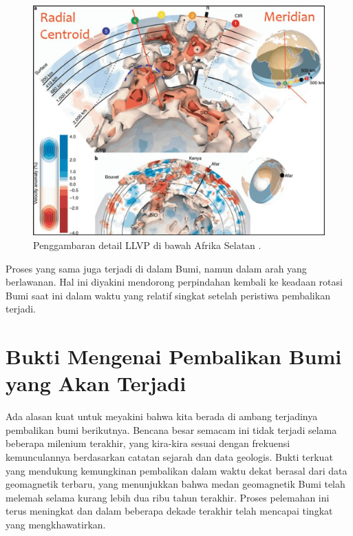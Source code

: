 \documentclass[10pt,twocolumn,letterpaper]{article}
\begin{document}
\begin{figure}[t]
\begin{center}
   \includegraphics[width=1\linewidth]{llvp.jpg}
\end{center}
   \caption{Penggambaran detail LLVP di bawah Afrika Selatan \cite{28}.}
\label{fig:12}
\label{fig:onecol}
\end{figure}

Proses yang sama juga terjadi di dalam Bumi, namun dalam arah yang berlawanan. Hal ini diyakini mendorong perpindahan kembali ke keadaan rotasi Bumi saat ini dalam waktu yang relatif singkat setelah peristiwa pembalikan terjadi.

\section{Bukti Mengenai Pembalikan Bumi yang Akan Terjadi}

Ada alasan kuat untuk meyakini bahwa kita berada di ambang terjadinya pembalikan bumi berikutnya. Bencana besar semacam ini tidak terjadi selama beberapa milenium terakhir, yang kira-kira sesuai dengan frekuensi kemunculannya berdasarkan catatan sejarah dan data geologis. Bukti terkuat yang mendukung kemungkinan pembalikan dalam waktu dekat berasal dari data geomagnetik terbaru, yang menunjukkan bahwa medan geomagnetik Bumi telah melemah selama kurang lebih dua ribu tahun terakhir. Proses pelemahan ini terus meningkat dan dalam beberapa dekade terakhir telah mencapai tingkat yang mengkhawatirkan.
\end{document}
